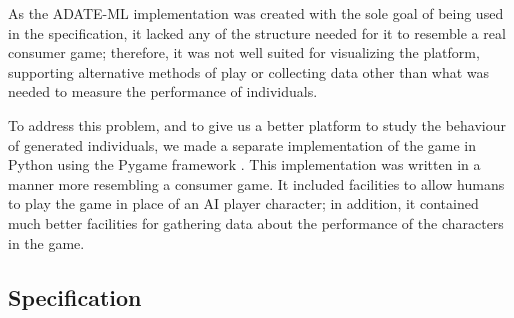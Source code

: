 As the ADATE-ML implementation was created with the sole goal of being used in
the specification, it lacked any of the structure needed for it to resemble a
real consumer game; therefore, it was not well suited for visualizing the
platform, supporting alternative methods of play or collecting data other than
what was needed to measure the performance of individuals.

 To address this problem, and to give us a
better platform to study the behaviour of generated individuals, we made a
separate implementation of the game in Python using the Pygame framework
\citep{pygame}. This implementation was written in a manner more resembling a
consumer game. It included facilities to allow humans to play the game in place
of an AI player character; in addition, it contained much better facilities for
gathering data about the performance of the characters in the game.

\subsection{Specification}
\label{sec:specification}



